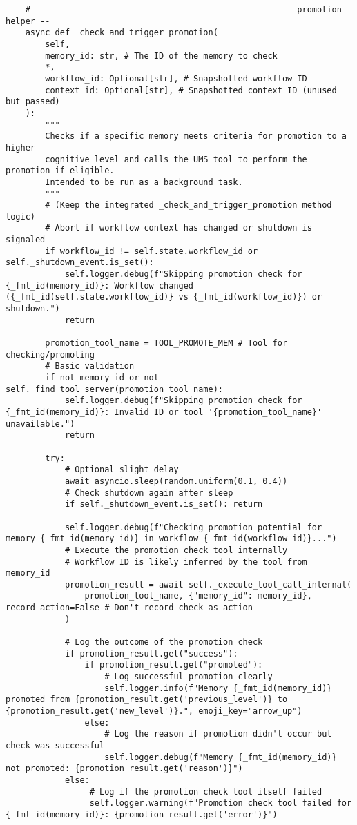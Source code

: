 \documentclass[12pt,a4paper]{article}
\begin{document}
\begin{pageablecode}
\begin{verbatim}
    # ---------------------------------------------------- promotion helper --
    async def _check_and_trigger_promotion(
        self,
        memory_id: str, # The ID of the memory to check
        *,
        workflow_id: Optional[str], # Snapshotted workflow ID
        context_id: Optional[str], # Snapshotted context ID (unused but passed)
    ):
        """
        Checks if a specific memory meets criteria for promotion to a higher
        cognitive level and calls the UMS tool to perform the promotion if eligible.
        Intended to be run as a background task.
        """
        # (Keep the integrated _check_and_trigger_promotion method logic)
        # Abort if workflow context has changed or shutdown is signaled
        if workflow_id != self.state.workflow_id or self._shutdown_event.is_set():
            self.logger.debug(f"Skipping promotion check for {_fmt_id(memory_id)}: Workflow changed ({_fmt_id(self.state.workflow_id)} vs {_fmt_id(workflow_id)}) or shutdown.")
            return

        promotion_tool_name = TOOL_PROMOTE_MEM # Tool for checking/promoting
        # Basic validation
        if not memory_id or not self._find_tool_server(promotion_tool_name):
            self.logger.debug(f"Skipping promotion check for {_fmt_id(memory_id)}: Invalid ID or tool '{promotion_tool_name}' unavailable.")
            return

        try:
            # Optional slight delay
            await asyncio.sleep(random.uniform(0.1, 0.4))
            # Check shutdown again after sleep
            if self._shutdown_event.is_set(): return

            self.logger.debug(f"Checking promotion potential for memory {_fmt_id(memory_id)} in workflow {_fmt_id(workflow_id)}...")
            # Execute the promotion check tool internally
            # Workflow ID is likely inferred by the tool from memory_id
            promotion_result = await self._execute_tool_call_internal(
                promotion_tool_name, {"memory_id": memory_id}, record_action=False # Don't record check as action
            )

            # Log the outcome of the promotion check
            if promotion_result.get("success"):
                if promotion_result.get("promoted"):
                    # Log successful promotion clearly
                    self.logger.info(f"Memory {_fmt_id(memory_id)} promoted from {promotion_result.get('previous_level')} to {promotion_result.get('new_level')}.", emoji_key="arrow_up")
                else:
                    # Log the reason if promotion didn't occur but check was successful
                    self.logger.debug(f"Memory {_fmt_id(memory_id)} not promoted: {promotion_result.get('reason')}")
            else:
                 # Log if the promotion check tool itself failed
                 self.logger.warning(f"Promotion check tool failed for {_fmt_id(memory_id)}: {promotion_result.get('error')}")


\end{verbatim}
\end{pageablecode}
\end{document}

